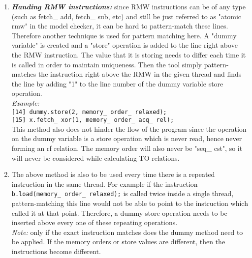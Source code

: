 \begin{enumerate}
	\item \textbf{\textit{Handing RMW instructions:}} since RMW instructions can be of any type (such as fetch\_ add, fetch\_ sub, etc) and still be just referred to as "atomic rmw" in the model checker, it can be hard to pattern-match these lines. Therefore another technique is used for pattern matching here. A "dummy variable" is created and a "store" operation is added to the line right above the RMW instruction. The value that it is storing needs to differ each time it is called in order to maintain uniqueness. Then the tool simply pattern-matches the instruction right above the RMW in the given thread and finds the line by adding "1" to the line number of the dummy variable store operation.\\
	\textit{Example:}\\ \texttt{[14] dummy.store(2, memory\_ order\_ relaxed);}\\ \texttt{[15] x.fetch\_ xor(1, memory\_ order\_ acq\_ rel);}\\
	This method also does not hinder the flow of the program since the operation on the dummy variable is a store operation which is never read, hence never forming an rf relation. The memory order will also never be "seq\_ cst", so it will never be considered while calculating TO relations.
	
	\item The above method is also to be used every time there is a repeated instruction in the same thread. For example if the instruction \texttt{b.load(memory\_ order\_ relaxed);} is called twice inside a single thread, pattern-matching this line would not be able to point to the instruction which called it at that point. Therefore, a dummy store operation needs to be inserted above every one of these repeating operations.\\\textit{Note:} only if the exact instruction matches does the dummy method need to be applied. If the memory orders or store values are different, then the instructions become different.
	
	

\end{enumerate}
